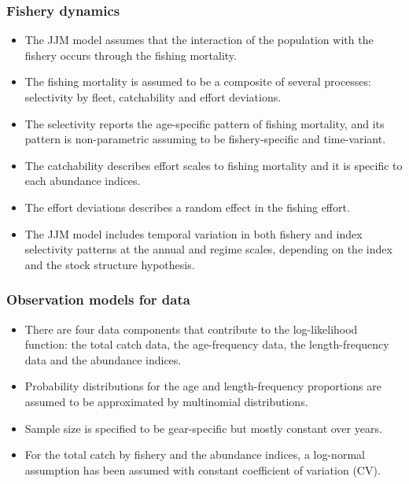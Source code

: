 \documentclass{article}
\begin{document}
\subsubsection{Fishery dynamics}

\begin{itemize}

\item The JJM model assumes that the interaction of the population with the fishery occurs through the fishing mortality.
    
\item The fishing mortality is assumed to be a composite of several processes: selectivity by fleet, catchability and effort deviations.

\item The selectivity reports the age-specific pattern of fishing mortality, and its pattern is non-parametric assuming to be fishery-specific and time-variant.

\item The catchability describes effort scales to fishing mortality and it is specific to each abundance indices.
    
\item The effort deviations describes a random effect in the fishing effort.

\item The JJM model includes temporal variation in both fishery and index selectivity patterns at the annual and regime scales, depending on the index and the stock structure hypothesis.
\end{itemize}

\subsubsection{Observation models for data}

\begin{itemize}

\item There are four data components that contribute to the log-likelihood function: the total catch data, the age-frequency data, the length-frequency data and the abundance indices.

\item Probability distributions for the age and length-frequency proportions are assumed to be approximated by multinomial distributions.

\item Sample size is specified to be gear-specific but mostly constant over years.

\item For the total catch by fishery and the abundance indices, a log-normal assumption has been assumed with constant coefficient of variation (CV).

\end{itemize}
\end{document}
